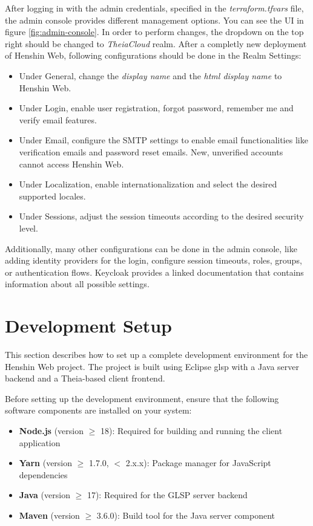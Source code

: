 After logging in with the admin credentials, specified in the \textit{terraform.tfvars} file, the admin console provides different management options. You can see the \acs{UI} in figure \ref{fig:admin-console}. In order to perform changes, the dropdown on the top right should be changed to \textit{TheiaCloud} realm. After a completly new deployment of Henshin Web, following configurations should be done in the Realm Settings:
\begin{itemize}
  \item Under General, change the \textit{display name} and the \textit{\ac{html} display name} to Henshin Web.
  \item Under Login, enable user registration, forgot password, remember me and verify email features.
  \item Under Email, configure the SMTP settings to enable email functionalities like verification emails and password reset emails. New, unverified accounts cannot access Henshin Web.
  \item Under Localization, enable internationalization and select the desired supported locales.
  \item Under Sessions, adjust the session timeouts according to the desired security level.
\end{itemize}

Additionally, many other configurations can be done in the admin console, like adding identity providers for the login, configure session timeouts, roles, groups, or authentication flows. Keycloak provides a linked documentation that contains information about all possible settings.

\section{Development Setup}
\label{sec:dev-setup}

This section describes how to set up a complete development environment for the Henshin Web project. The project is built using Eclipse \ac{glsp} with a Java server backend and a Theia-based client frontend.

Before setting up the development environment, ensure that the following software components are installed on your system:

\begin{itemize}
    \item \textbf{Node.js} (version $\geq$ 18): Required for building and running the client application
    \item \textbf{Yarn} (version $\geq$ 1.7.0, $<$ 2.x.x): Package manager for JavaScript dependencies
    \item \textbf{Java} (version $\geq$ 17): Required for the GLSP server backend
    \item \textbf{Maven} (version $\geq$ 3.6.0): Build tool for the Java server component
\end{itemize}

